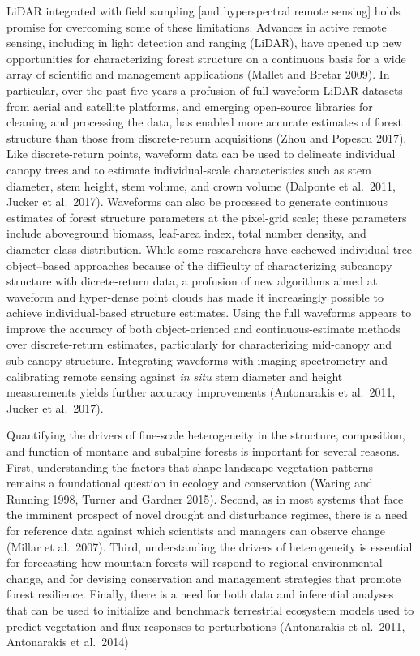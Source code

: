 \documentclass[
  12pt,
]{article}
\begin{document}
LiDAR integrated with field sampling {[}and hyperspectral remote
sensing{]} holds promise for overcoming some of these limitations.
Advances in active remote sensing, including in light detection and
ranging (LiDAR), have opened up new opportunities for characterizing
forest structure on a continuous basis for a wide array of scientific
and management applications (Mallet and Bretar 2009). In particular,
over the past five years a profusion of full waveform LiDAR datasets
from aerial and satellite platforms, and emerging open-source libraries
for cleaning and processing the data, has enabled more accurate
estimates of forest structure than those from discrete-return
acquisitions (Zhou and Popescu 2017). Like discrete-return points,
waveform data can be used to delineate individual canopy trees and to
estimate individual-scale characteristics such as stem diameter, stem
height, stem volume, and crown volume (Dalponte et al.~2011, Jucker et
al.~2017). Waveforms can also be processed to generate continuous
estimates of forest structure parameters at the pixel-grid scale; these
parameters include aboveground biomass, leaf-area index, total number
density, and diameter-class distribution. While some researchers have
eschewed individual tree object--based approaches because of the
difficulty of characterizing subcanopy structure with dicrete-return
data, a profusion of new algorithms aimed at waveform and hyper-dense
point clouds has made it increasingly possible to achieve
individual-based structure estimates. Using the full waveforms appears
to improve the accuracy of both object-oriented and continuous-estimate
methods over discrete-return estimates, particularly for characterizing
mid-canopy and sub-canopy structure. Integrating waveforms with imaging
spectrometry and calibrating remote sensing against \emph{in situ} stem
diameter and height measurements yields further accuracy improvements
(Antonarakis et al.~2011, Jucker et al.~2017).

Quantifying the drivers of fine-scale heterogeneity in the structure,
composition, and function of montane and subalpine forests is important
for several reasons. First, understanding the factors that shape
landscape vegetation patterns remains a foundational question in ecology
and conservation (Waring and Running 1998, Turner and Gardner 2015).
Second, as in most systems that face the imminent prospect of novel
drought and disturbance regimes, there is a need for reference data
against which scientists and managers can observe change (Millar et
al.~2007). Third, understanding the drivers of heterogeneity is
essential for forecasting how mountain forests will respond to regional
environmental change, and for devising conservation and management
strategies that promote forest resilience. Finally, there is a need for
both data and inferential analyses that can be used to initialize and
benchmark terrestrial ecosystem models used to predict vegetation and
flux responses to perturbations (Antonarakis et al.~2011, Antonarakis et
al.~2014)
\end{document}
